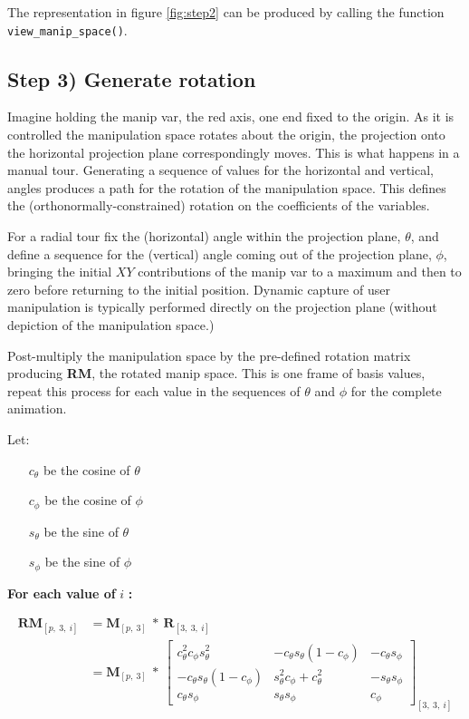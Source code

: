 The representation in figure \ref{fig:step2} can be produced by calling
the function \texttt{view\_manip\_space()}.

\hypertarget{step-3-generate-rotation}{%
\subsection{Step 3) Generate rotation}\label{step-3-generate-rotation}}

Imagine holding the manip var, the red axis, one end fixed to the
origin. As it is controlled the manipulation space rotates about the
origin, the projection onto the horizontal projection plane
correspondingly moves. This is what happens in a manual tour. Generating
a sequence of values for the horizontal and vertical, angles produces a
path for the rotation of the manipulation space. This defines the
(orthonormally-constrained) rotation on the coefficients of the
variables.

For a radial tour fix the (horizontal) angle within the projection
plane, \(\theta\), and define a sequence for the (vertical) angle coming
out of the projection plane, \(\phi\), bringing the initial \(XY\)
contributions of the manip var to a maximum and then to zero before
returning to the initial position. Dynamic capture of user manipulation
is typically performed directly on the projection plane (without
depiction of the manipulation space.)

Post-multiply the manipulation space by the pre-defined rotation matrix
producing \textbf{RM}, the rotated manip space. This is one frame of
basis values, repeat this process for each value in the sequences of
\(\theta\) and \(\phi\) for the complete animation.

Let:

\begin{itemize}
  \item[$c_\theta$] be the cosine of $\theta$
  \item[$c_\phi$]   be the cosine of $\phi$
  \item[$s_\theta$] be the sine of   $\theta$
  \item[$s_\phi$]   be the sine of   $\phi$
\end{itemize}

\textbf{For each value of } \(i\) \textbf{:}

\begin{align*}
  \textbf{RM}_{[p,~3,~i]}
  &= \textbf{M}_{[p,~3]} ~*~ \textbf{R}_{[3,~3,~i]} \\
  &= \textbf{M}_{[p,~3]}
    ~*~
  \begin{bmatrix}
    c_\theta^2 c_\phi s_\theta^2 &
    -c_\theta s_\theta (1 - c_\phi) &
    -c_\theta s_\phi \\
    -c_\theta s_\theta (1 - c_\phi) &
    s_\theta^2 c_\phi + c_\theta^2 &
    -s_\theta s_\phi \\
    c_\theta s_\phi &
    s_\theta s_\phi &
    c_\phi
  \end{bmatrix}_{[3,~3,~i]}
\end{align*}

